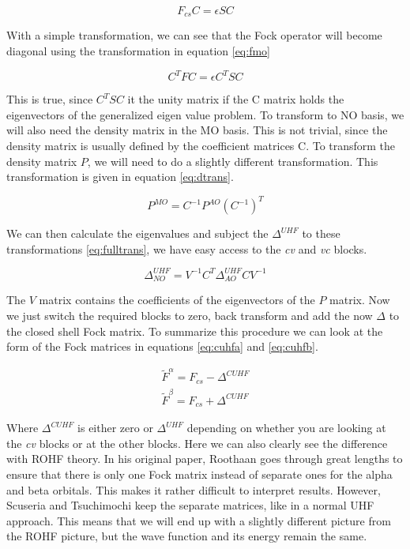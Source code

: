 \documentclass[twoside,twocolumn,9pt]{article}
\begin{document}
\begin{equation}\label{eq:roothaan}
  F_{cs}C = \epsilon S C
\end{equation}

With a simple transformation, we can see that the Fock operator will become diagonal using the transformation in equation \eqref{eq:fmo}

\begin{equation}\label{eq:fmo}
  C^T F C = \epsilon C^T S C
\end{equation}

This is true, since $C^T S C$ it the unity matrix if the C matrix holds the eigenvectors of the generalized eigen value problem. To transform to NO basis, we will also need the
density matrix in the MO basis. This is not trivial, since the density matrix is usually defined by the coefficient matrices C. To transform the density matrix $P$, we will need
to do a slightly different transformation. This transformation is given in equation \eqref{eq:dtrans}\cite{Declercq2020}.

\begin{equation}\label{eq:dtrans}
  P^{MO} = C^{-1}P^{AO}(C^{-1})^T
\end{equation}

We can then calculate the eigenvalues and subject the $\Delta^{UHF}$ to these transformations \eqref{eq:fulltrans}, we have easy access to the \textit{cv} and \textit{vc} blocks.

\begin{equation}\label{eq:fulltrans}
  \Delta_{NO}^{UHF} = V^{-1} C^T \Delta^{UHF}_{AO} C V^{-1}
\end{equation}

The $V$ matrix contains the coefficients of the eigenvectors of the $P$ matrix. Now we just switch the required blocks to zero, back transform and add the now $\Delta$ to the closed
shell Fock matrix. To summarize this procedure we can look at the form of the Fock matrices in equations \eqref{eq:cuhfa} and \eqref{eq:cuhfb}.

\begin{subequations}
  \begin{align}
    \label{eq:cuhfa}
    \tilde{F}^\alpha = F_{cs} - \Delta^{CUHF} \\
    \label{eq:cuhfb}
    \tilde{F}^\beta = F_{cs} + \Delta^{CUHF}
  \end{align}
\end{subequations}

Where $\Delta^{CUHF}$ is either zero or $\Delta^{UHF}$ depending on whether you are looking at the \textit{cv} blocks or at the other blocks. Here we can also clearly see the
difference with ROHF theory. In his original paper, Roothaan goes through great lengths to ensure that there is only one Fock matrix instead of separate ones for the alpha and
beta orbitals\cite{Roothaan1960}. This makes it rather difficult to interpret results\cite{Scuseria2010}. However, Scuseria and Tsuchimochi keep the separate matrices, like in a
normal UHF approach. This means that we will end up with a slightly different picture from the ROHF picture, but the wave function and its energy remain the same\cite{Scuseria2010}.
\end{document}
